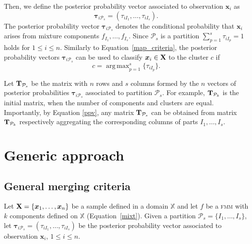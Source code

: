 \documentclass[submit]{smj}
\DeclareMathOperator*{\argmax}{arg\,max}
\theoremstyle{definition}
\newcommand{\m}[1]{\boldsymbol{#1}}
\newcommand{\fmm}{\textsc{fmm}\xspace}
\newcommand{\X}{\text{\textbf{X}}}
\begin{document}
Then, we define the posterior probability vector associated to observation $\m x_i$ as
\begin{equation}\label{ppv}
\m\tau_{i \mathcal{P}_s} = \left(\tau_{i I_1} , \dots, \tau_{i I_s}  \right).
\end{equation}
The posterior probability vector $\m \tau_{i \mathcal{P}_s}$ denotes the conditional probability that $\m x_i$ arises from mixture components $f_{I_1}, \dots, f_{I_s}$. Since $\mathcal{P}_s$ is a partition $\sum_{p=1}^s \tau_{i I_p} = 1$ holds  for $1 \leq i \leq n$. Similarly to Equation~\ref{map_criteria}, the posterior probability vectors $\m\tau_{i \mathcal{P}_s}$ can be used to classify $\m x_i \in \X$ to the cluster $c$ if
\begin{equation}\label{cluster_criteria}
c= \argmax_{p=1}^s \{ \tau_{i I_p} \}.
\end{equation}

Let $\text{\textbf{T}}_{\mathcal{P}_s}$ be the matrix with $n$ rows and $s$ columns formed by the $n$ vectors of posterior probabilities $\m \tau_{i\mathcal{P}_s}$ associated to partition $\mathcal{P}_s$. For example, $\text{\textbf{T}}_{\mathcal{P}_k}$ is the initial matrix, when the number of components and clusters are equal. Importantly, by Equation \ref{ppv}, any matrix $\text{\textbf{T}}_{\mathcal{P}_s}$ can be obtained from matrix $\text{\textbf{T}}_{\mathcal{P}_k}$ respectively aggregating the corresponding columns of parts $I_1, \dots, I_s$.


\section{Generic approach}\label{generic_merging}

\subsection{General merging criteria}\label{merging_criteria}

Let $\text{\textbf{X}} = \{\m x_1,\dots,\m x_n \}$ be a sample defined in  a domain $\mathbb{X}$ and let $f$ be a \fmm with $k$ components defined on $\mathbb{X}$ (Equation~\ref{mixt}). Given a partition $\mathcal{P}_s = \{I_1, \dots, I_s\}$, let $\m\tau_{i \mathcal{P}_s}= \left( \tau_{i I_1} , \dots, \tau_{i I_s}  \right)$ be the posterior probability vector associated to observation $\m x_i$, $1\leq i \leq n $.
\end{document}

